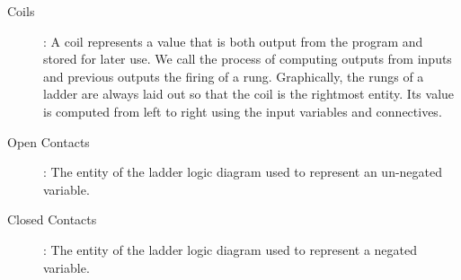 \begin{comment}
The international standard for programmable logic controllers IEC
61131 \cite{IEC03} describes the graphical language ladder logic. It gets its
name from its graphical ``ladder'' like appearance which was chosen to suit
the control engineers responsible for their design. Each rung of the ladder is
used to compute an output variable from one or more input variables in the rung.
In the railway industry these input variables are referred to as contacts and
the output variables are referred to as coils. A description of the entities representing these variables
is as follows:
\end{comment}

\smallskip

\begin{description}

\item[Coils]: A coil represents a value that is both output from the program and stored for later use.  We call the process of computing outputs from inputs and previous outputs the firing of a rung. Graphically, the rungs of a ladder are always laid out so that the coil is the rightmost entity. Its value is computed from left to right using the input variables and connectives.

\item[Open Contacts]: The entity of the ladder logic diagram used to represent an un-negated variable.

\item[Closed Contacts]: The entity of the ladder logic diagram used to represent a negated variable.

\begin{comment}
\item[Coils]: These are used to represent values that are both stored for later use
  and output from the program. The value of a coil is calculated when a rung
  fires making use of the current set of inputs, the previous set of outputs
  and any outputs already computed for this cycle. The coil is always the
  rightmost entity of the rung and its value is computed by executing the
  rung from left to right.


\item[Open Contacts]: This entity represents the value of an un-negated variable


\item[Closed Contacts]: This entity represents the value of a negated variable.
\end{comment}
\end{description}

